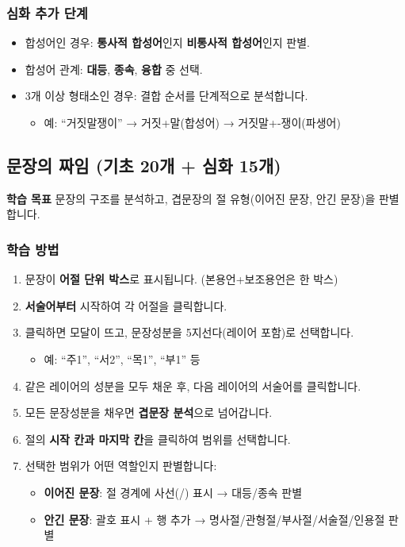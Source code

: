 \documentclass[11pt,a4paper]{article}
\newcommand{\goalbox}[1]{%
  \vspace{0.3cm}
  \noindent\colorbox{lightbg}{\parbox{\dimexpr\textwidth-2\fboxsep}{%
    \textbf{\color{korfarm}학습 목표} \quad #1%
  }}
  \vspace{0.3cm}
}
\begin{document}
\subsubsection{심화 추가 단계}
\begin{itemize}[nosep,leftmargin=*]
  \item 합성어인 경우: \textbf{통사적 합성어}인지 \textbf{비통사적 합성어}인지 판별.
  \item 합성어 관계: \textbf{대등}, \textbf{종속}, \textbf{융합} 중 선택.
  \item 3개 이상 형태소인 경우: 결합 순서를 단계적으로 분석합니다.
    \begin{itemize}[nosep]
      \item 예: ``거짓말쟁이'' → 거짓+말(합성어) → 거짓말+-쟁이(파생어)
    \end{itemize}
\end{itemize}

\newpage
\subsection{문장의 짜임 (기초 20개 + 심화 15개)}
\goalbox{문장의 구조를 분석하고, 겹문장의 절 유형(이어진 문장, 안긴 문장)을 판별합니다.}

\subsubsection{학습 방법}
\begin{enumerate}[nosep,leftmargin=*]
  \item 문장이 \textbf{어절 단위 박스}로 표시됩니다. (본용언+보조용언은 한 박스)
  \item \textbf{서술어부터} 시작하여 각 어절을 클릭합니다.
  \item 클릭하면 모달이 뜨고, 문장성분을 5지선다(레이어 포함)로 선택합니다.
    \begin{itemize}[nosep]
      \item 예: ``주1'', ``서2'', ``목1'', ``부1'' 등
    \end{itemize}
  \item 같은 레이어의 성분을 모두 채운 후, 다음 레이어의 서술어를 클릭합니다.
  \item 모든 문장성분을 채우면 \textbf{겹문장 분석}으로 넘어갑니다.
  \item 절의 \textbf{시작 칸과 마지막 칸}을 클릭하여 범위를 선택합니다.
  \item 선택한 범위가 어떤 역할인지 판별합니다:
    \begin{itemize}[nosep]
      \item \textbf{이어진 문장}: 절 경계에 사선(/) 표시 → 대등/종속 판별
      \item \textbf{안긴 문장}: 괄호 표시 + 행 추가 → 명사절/관형절/부사절/서술절/인용절 판별
    \end{itemize}
\end{enumerate}
\end{document}

